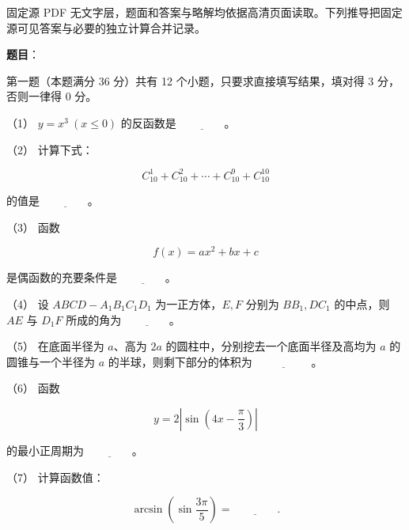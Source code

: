 

\begin{gktip}
固定源 PDF 无文字层，题面和答案与略解均依据高清页面读取。下列推导把固定源可见答案与必要的独立计算合并记录。
\end{gktip}

\begin{answer}

\textbf{题目}：

第一题（本题满分 36 分）共有 12 个小题，只要求直接填写结果，填对得 3 分，否则一律得 0 分。

（1） $y=x^3\ (x\leq0)$ 的反函数是 $\underline{\hspace{4em}}$。

（2） 计算下式：

\nopagebreak[4]
\[
C_{10}^{1}+C_{10}^{2}+\cdots+C_{10}^{9}+C_{10}^{10}
\]

的值是 $\underline{\hspace{4em}}$。

（3） 函数

\nopagebreak[4]
\[
f(x)=ax^2+bx+c
\]

是偶函数的充要条件是 $\underline{\hspace{4em}}$。

（4） 设 $ABCD-A_1B_1C_1D_1$ 为一正方体，$E,F$ 分别为 $BB_1,DC_1$ 的中点，则 $AE$ 与 $D_1F$ 所成的角为 $\underline{\hspace{4em}}$。

（5） 在底面半径为 $a$、高为 $2a$ 的圆柱中，分别挖去一个底面半径及高均为 $a$ 的圆锥与一个半径为 $a$ 的半球，则剩下部分的体积为 $\underline{\hspace{5em}}$。

（6） 函数

\nopagebreak[4]
\[
y=2\left|\sin\left(4x-\frac\pi3\right)\right|
\]

的最小正周期为 $\underline{\hspace{4em}}$。

（7） 计算函数值：

\nopagebreak[4]
\[
\arcsin\left(\sin\frac{3\pi}{5}\right)=\underline{\hspace{4em}}.
\]


\end{answer}

